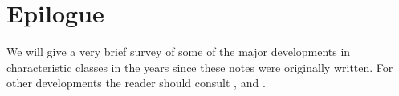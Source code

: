 \documentclass[../main]{subfiles}
\begin{document}
\chapter{Epilogue}\label{ch:21}
We will give a very brief survey of some of the major developments in characteristic classes in the years since these notes were originally written. For other developments the reader should consult \cite{husemoller},\cite{adams1972} and \cite{atiyah1967}.




\end{document}
